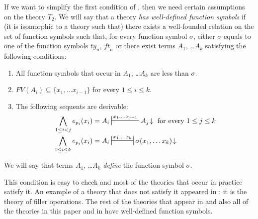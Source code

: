 \documentclass[reqno]{amsart}
\theoremstyle{definition}
\theoremstyle{remark}
\newcommand{\ft}{\mathit{ft}}
\newcommand{\ty}{\mathit{ty}}
\numberwithin{figure}{section}
\begin{document}
If we want to simplify the first condition of , then we need certain assumptions on the theory $T_2$.
We will say that a theory \emph{has well-defined function symbols} if (it is isomorphic to a theory such that) there exists a well-founded relation on the set of function symbols such that,
for every function symbol $\sigma$, either $\sigma$ equals to one of the function symbols $\ty_n$, $\ft_n$ or there exist terms $A_1$, \ldots $A_k$ satisfying the following conditions:
\begin{enumerate}
\item All function symbols that occur in $A_1$, \ldots $A_k$ are less than $\sigma$.
\item $FV(A_i) \subseteq \{ x_1, \ldots x_{i-1} \}$ for every $1 \leq i \leq k$.
\item The following sequents are derivable:
\begin{align*}
\bigwedge_{1 \leq i < j} e_{p_i}(x_i) = A_i & \sststile{}{x_1, \ldots x_{j-1}} A_j\!\downarrow \text{ for every } 1 \leq j \leq k \\
\bigwedge_{1 \leq i \leq k} e_{p_i}(x_i) = A_i & \ssststile{}{x_1, \ldots x_k} \sigma(x_1, \ldots x_k)\!\downarrow
\end{align*}
\end{enumerate}
We will say that terms $A_1$, \ldots $A_k$ \emph{define} the function symbol $\sigma$.

This condition is easy to check and most of the theories that occur in practice satisfy it.
An example of a theory that does not satisfy it appeared in \cite{alg-models}: it is the theory of filler operations.
The rest of the theories that appear in \cite{alg-models} and also all of the theories in this paper and in \cite{alg-tt} have well-defined function symbols.
\end{document}

